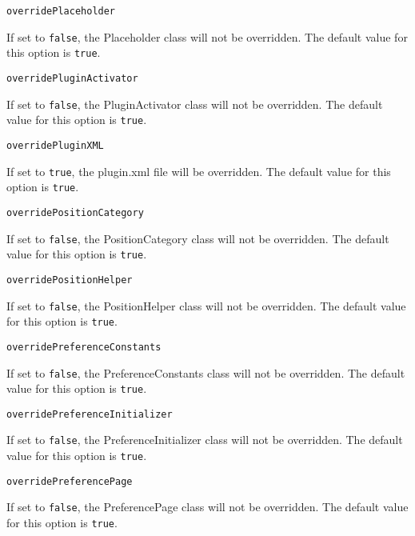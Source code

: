 \noindent\texttt{overridePlaceholder}
\begin{myindentpar}{1cm}
If set to \texttt{false}, the Placeholder class will not be overridden. The default value for this option is \texttt{true}.
\end{myindentpar}

\noindent\texttt{overridePluginActivator}
\begin{myindentpar}{1cm}
If set to \texttt{false}, the PluginActivator class will not be overridden. The default value for this option is \texttt{true}.
\end{myindentpar}

\noindent\texttt{overridePluginXML}
\begin{myindentpar}{1cm}
If set to \texttt{true}, the plugin.xml file will be overridden. The default value for this option is \texttt{true}.
\end{myindentpar}

\noindent\texttt{overridePositionCategory}
\begin{myindentpar}{1cm}
If set to \texttt{false}, the PositionCategory class will not be overridden. The default value for this option is \texttt{true}.
\end{myindentpar}

\noindent\texttt{overridePositionHelper}
\begin{myindentpar}{1cm}
If set to \texttt{false}, the PositionHelper class will not be overridden. The default value for this option is \texttt{true}.
\end{myindentpar}

\noindent\texttt{overridePreferenceConstants}
\begin{myindentpar}{1cm}
If set to \texttt{false}, the PreferenceConstants class will not be overridden. The default value for this option is \texttt{true}.
\end{myindentpar}

\noindent\texttt{overridePreferenceInitializer}
\begin{myindentpar}{1cm}
If set to \texttt{false}, the PreferenceInitializer class will not be overridden. The default value for this option is \texttt{true}.
\end{myindentpar}

\noindent\texttt{overridePreferencePage}
\begin{myindentpar}{1cm}
If set to \texttt{false}, the PreferencePage class will not be overridden. The default value for this option is \texttt{true}.
\end{myindentpar}

